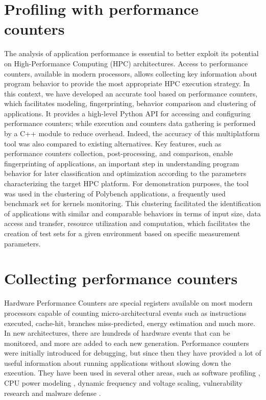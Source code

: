 \section{Profiling with performance counters} \label{sec:profiling_with_performance_counters}
The analysis of application performance is essential to better exploit its potential on High-Performance Computing (HPC) architectures. Access to performance counters, available in modern processors, allows collecting key information about program behavior to provide the most appropriate HPC execution strategy.
In this context, we have developed an accurate tool based on performance counters, which facilitates modeling, fingerprinting, behavior comparison and clustering of applications.
It provides a high-level Python API for accessing and configuring performance counters; while execution and counters data gathering is  performed by a C++ module to reduce overhead. 
Indeed, the accuracy of this multiplatform tool was also compared to existing alternatives.  
Key features, such as performance counters collection, post-processing, and comparison, enable fingerprinting of applications, an important step in understanding program behavior for later classification and optimization according to the parameters characterizing the target HPC platform.
For demonstration purposes, the tool was used in the clustering of Polybench applications, a frequently used benchmark set for kernels monitoring. 
This clustering facilitated the identification of applications with similar and comparable behaviors in terms of input size, data access and transfer, resource utilization and computation, which facilitates the creation of test sets for a given environment based on specific measurement parameters.


\section{Collecting performance counters} \label{sec:collecting_performance_countersl}

Hardware Performance Counters are special registers available on most modern processors capable of counting micro-architectural events such as instructions executed, cache-hit, branches miss-predicted, energy estimation and much more.  In new architectures, there are hundreds of hardware events that can be monitored, and more are added to each new generation. 
Performance counters were initially introduced for debugging, but since then they have provided a lot of useful information about running applications without slowing down the execution.
They have been used in several other areas, such as software profiling \cite{Melo2010Perf, Kufrin2005Perfsuite, Knupfer2011Scorep}, CPU power modeling \cite{Zamani2012ASystems}, dynamic frequency and voltage scaling, vulnerability research and malware defense \cite{Demme2013OnCounters}.


